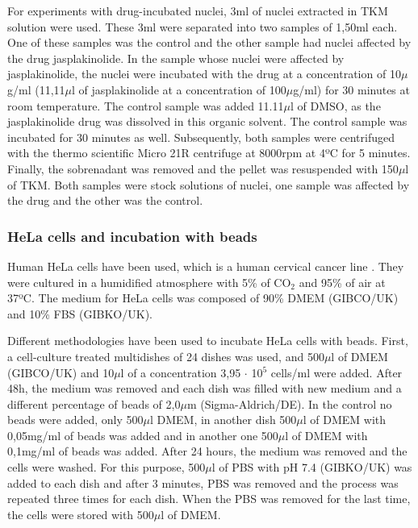 \documentclass[12pt, a4paper]{article} %
\begin{document}
	For experiments with drug-incubated nuclei, 3ml of nuclei extracted in TKM solution were used. These 3ml were separated into two samples of 1,50ml each. One of these samples was the control and the other sample had nuclei affected by the drug jasplakinolide. In the sample whose nuclei were affected by jasplakinolide, the nuclei were incubated with the drug at a concentration of 10$\mu$g/ml (11,11$\mu$l of jasplakinolide at a concentration of 100$\mu$g/ml) for 30 minutes at room temperature. The control sample was added 11.11$\mu$l of DMSO, as the jasplakinolide drug was dissolved in this organic solvent. The control sample was incubated for 30 minutes as well. Subsequently, both samples were centrifuged with the thermo scientific Micro 21R centrifuge at 8000rpm at 4ºC for 5 minutes. Finally, the sobrenadant was removed and the pellet was resuspended with 150$\mu$l of TKM. Both samples were stock solutions of nuclei, one sample was affected by the drug and the other was the control.
	
	\setlength{\parskip}{0mm}
	
	\subsubsection{HeLa cells and incubation with beads}
	
	Human HeLa cells have been used, which is a human cervical cancer line \cite{gey1952tissue}. They were cultured in a humidified atmosphere with 5\% of CO$_{2}$ and 95\% of air at 37ºC. The medium for HeLa cells was composed of 90\% DMEM (GIBCO/UK) and 10\% FBS (GIBKO/UK).
	
	\setlength{\parskip}{4mm}
	
	Different methodologies have been used to incubate HeLa cells with beads. First, a cell-culture treated multidishes of 24 dishes was used, and 500$\mu$l of DMEM (GIBCO/UK) and 10$\mu$l of a concentration 3,95 $\cdot$ 10$^{5}$ cells/ml were added. After 48h, the medium was removed and each dish was filled with new medium and a different percentage of beads of 2,0$\mu$m (Sigma-Aldrich/DE). In the control no beads were added, only 500$\mu$l DMEM, in another dish 500$\mu$l of DMEM with 0,05mg/ml of beads was added and in another one 500$\mu$l of DMEM with 0,1mg/ml of beads was added. After 24 hours, the medium was removed and the cells were washed. For this purpose, 500$\mu$l of PBS with pH 7.4 (GIBKO/UK) was added to each dish and after 3 minutes, PBS was removed and the process was repeated three times for each dish. When the PBS was removed for the last time, the cells were stored with 500$\mu$l of DMEM.
	
\end{document}
